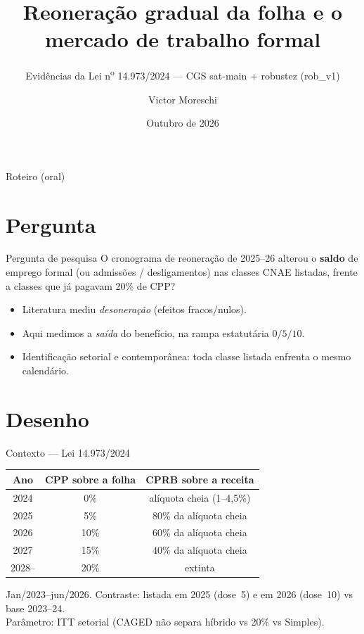 \documentclass[aspectratio=169,11pt]{beamer}
\title{Reoneração gradual da folha e o mercado de trabalho formal}
\subtitle{Evidências da Lei n\textsuperscript{o} 14.973/2024 --- CGS sat-main + robustez (rob\_v1)}
\author{Victor Moreschi}
\institute{Causal Inference II --- Prof.\ Cristine Campos de Xavier Pinto}
\date{Outubro de 2026}
\begin{document}
\begin{frame}[plain]
  \titlepage
\end{frame}

\begin{frame}{Roteiro (oral)}
\tableofcontents[sections={1-5}]
\end{frame}

\section{Pergunta}
\begin{frame}{Pergunta de pesquisa}
O cronograma de reoneração de 2025--26 alterou o \textbf{saldo} de emprego formal
(ou admissões / desligamentos) nas classes CNAE listadas, frente a classes que já
pagavam 20\% de CPP?
\begin{itemize}
  \item Literatura mediu \emph{desoneração} (efeitos fracos/nulos).
  \item Aqui medimos a \emph{saída} do benefício, na rampa estatutária \(0/5/10\).
  \item Identificação setorial e contemporânea: toda classe listada enfrenta o mesmo calendário.
\end{itemize}
\end{frame}

\section{Desenho}
\begin{frame}{Contexto --- Lei 14.973/2024}
\begin{center}
\begin{tabular}{ccc}
\toprule
Ano & CPP sobre a folha & CPRB sobre a receita \\
\midrule
2024 & 0\% & alíquota cheia (1--4,5\%) \\
2025 & 5\% & 80\% da alíquota cheia \\
2026 & 10\% & 60\% da alíquota cheia \\
2027 & 15\% & 40\% da alíquota cheia \\
2028-- & 20\% & extinta \\
\bottomrule
\end{tabular}
\end{center}
\vspace{0.5em}
Jan/2023--jun/2026. Contraste: listada em 2025 (dose~5) e em 2026 (dose~10) vs base 2023--24.\\
Parâmetro: ITT setorial (CAGED não separa híbrido vs 20\% vs Simples).
\end{frame}
\end{document}
